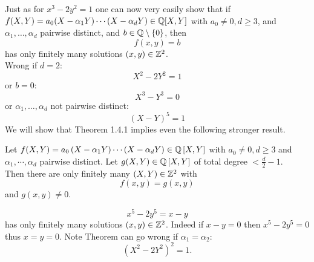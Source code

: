 \documentclass[NumTh.tex]{subfiles}
\begin{document}
Just as for $x^3-2y^2=1$ one can now very easily show that if $f(X,Y)=a_0 (X-\alpha_1 Y)\cdots(X-\alpha_d Y)\in\mathbb{Q}[X,Y]$ with $a_0\ne0, d\ge 3$, and $\alpha_1,\dots,\alpha_d$ pairwise distinct, and $b\in\mathbb{Q}\setminus\left\{0\right\}$, then
$$f(x,y)=b$$
has only finitely many solutions $\left(x,y\right)\in\mathbb{Z}^2$. \\
Wrong if $d=2$:
$$X^2-2Y^2=1$$
or $b=0$:
$$X^3-Y^3=0$$
or $\alpha_1,\dots,\alpha_d$ not pairwise distinct: 
$$(X-Y)^5=1$$
We will show that Theorem 1.4.1 implies even the following stronger result. 

\begin{theorem}
Let $f(X,Y)=a_0 \left(X-\alpha_1 Y\right)\cdots\allowbreak\left(X-\alpha_d Y\right)\in\mathbb{Q}\left[X,Y\right]$ with $a_0\ne 0, d\ge 3$ and $\alpha_1,\cdots,\alpha_d$ pairwise distinct. Let $g(X,Y)\in\mathbb{Q}\left[X,Y\right]$ of total degree $<\frac{d}{2}-1$. 
\\
Then there are only finitely many $(X,Y)\in\mathbb{Z}^2$ with
$$f(x,y)=g(x,y)$$
and
$g(x,y)\ne 0$.
\end{theorem}

\begin{ex}
$$x^5-2y^5=x-y$$
has only finitely many solutions $\left(x,y\right)\in\mathbb{Z}^2$. Indeed if $x-y=0$ then $x^5-2y^5=0$ thus $x=y=0$. 
Note Theorem can go wrong if $\alpha_1=\alpha_2$: 
$$(X^2-2Y^2 )^2=1.$$
\end{ex}
\end{document}
